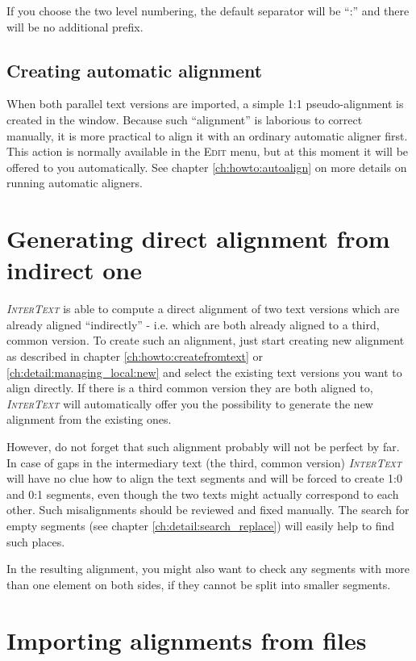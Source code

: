 \documentclass[a4paper,10pt,oneside]{book}
\newcommand{\IT}{\textit{\textsc{InterText}}\xspace}
\newcommand{\menu}[1]{\textsc{#1}}
\begin{document}
If you choose the two level numbering, the default separator will be ``:'' and there will be no additional prefix.

\subsection{Creating automatic alignment}\label{ch:detail:managing_local:new:align}

When both parallel text versions are imported, a simple 1:1 pseudo-alignment is created in the window. Because such ``alignment'' is laborious to correct manually, it is more practical to align it with an ordinary automatic aligner first. This action is normally available in the \menu{Edit} menu, but at this moment it will be offered to you automatically. See chapter \ref{ch:howto:autoalign} on more details on running automatic aligners.

\section{Generating direct alignment from indirect one}\label{ch:detail:managing_local:generate}

\IT is able to compute a direct alignment of two text versions which are already aligned ``indirectly'' - i.e. which are both already aligned to a third, common version. To create such an alignment, just start creating new alignment as described in chapter \ref{ch:howto:createfromtext} or \ref{ch:detail:managing_local:new} and select the existing text versions you want to align directly. If there is a third common version they are both aligned to, \IT will automatically offer you the possibility to generate the new alignment from the existing ones.

However, do not forget that such alignment probably will not be perfect by far. In case of gaps in the intermediary text (the third, common version) \IT will have no clue how to align the text segments and will be forced to create 1:0 and 0:1 segments, even though the two texts might actually correspond to each other. Such misalignments should be reviewed and fixed manually. The search for empty segments (see chapter \ref{ch:detail:search_replace}) will easily help to find such places.

In the resulting alignment, you might also want to check any segments with more than one element on both sides, if they cannot be split into smaller segments.

\section{Importing alignments from files}\label{ch:detail:managing_local:import}
\end{document}

